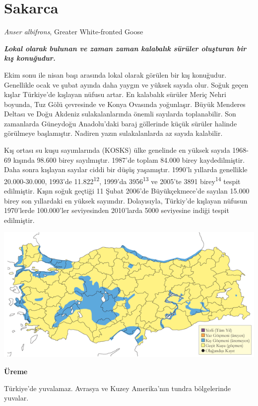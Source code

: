 \documentclass[
  letterpaper,
  DIV=11,
  numbers=noendperiod]{scrreprt}
\begin{document}
\section{Sakarca}\label{sakarca}

\emph{Anser albifrons}, Greater White-fronted Goose

\textbf{\emph{Lokal olarak bulunan ve zaman zaman kalabalık sürüler
oluşturan bir kış konuğudur.}}

Ekim sonu ile nisan başı arasında lokal olarak görülen bir kış
konuğudur. Genellikle ocak ve şubat ayında daha yaygın ve yüksek sayıda
olur. Soğuk geçen kışlar Türkiye'de kışlayan nüfusu artar. En kalabalık
sürüler Meriç Nehri boyunda, Tuz Gölü çevresinde ve Konya Ovasında
yoğunlaşır. Büyük Menderes Deltası ve Doğu Akdeniz sulakalanlarında
önemli sayılarda toplanabilir. Son zamanlarda Güneydoğu Anadolu'daki
baraj göllerinde küçük sürüler halinde görülmeye başlamıştır. Nadiren
yazın sulakalanlarda az sayıda kalabilir.

Kış ortası su kuşu sayımlarında (KOSKS) ülke genelinde en yüksek sayıda
1968-69 kışında 98.600 birey sayılmıştır. 1987'de toplam 84.000 birey
kaydedilmiştir. Daha sonra kışlayan sayılar ciddi bir düşüş yaşamıştır.
1990'lı yıllarda genellikle 20.000-30.000, 1993'de
11.822\textsuperscript{12}, 1999'da 3956\textsuperscript{13} ve 2005'te
3891 birey\textsuperscript{14} tespit edilmiştir. Kışın soğuk geçtiği 11
Şubat 2006'de Büyükçekmece'de sayılan 15.000 birey son yıllardaki en
yüksek sayımdır. Dolayısıyla, Türkiy'de kışlayan nüfusun 1970'lerde
100.000'ler seviyesinden 2010'larda 5000 seviyesine indiği tespit
edilmiştir.

\includegraphics{images/harita_Page_003.png}

\textbf{Üreme}

Türkiye'de yuvalamaz. Avrasya ve Kuzey Amerika'nın tundra bölgelerinde
yuvalar.
\end{document}
